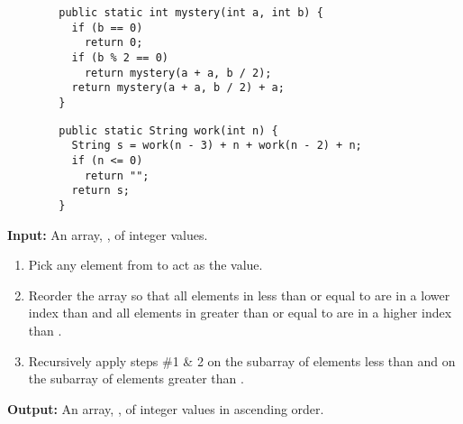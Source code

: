 

\def\AssignmentCourse{AP Computer Science A}
\def\AssignmentNumber{15}
\def\AssignmentTitle{Recursive Functions}


  \begin{questions}


      \begin{lstlisting}
        public static int mystery(int a, int b) {
          if (b == 0)
            return 0;
          if (b % 2 == 0)
            return mystery(a + a, b / 2);
          return mystery(a + a, b / 2) + a;
        }
      \end{lstlisting}

      \begin{lstlisting}
        public static String work(int n) {
          String s = work(n - 3) + n + work(n - 2) + n;
          if (n <= 0)
            return "";
          return s;
        }
      \end{lstlisting}

      \textbf{Input:} An array, , of integer values.

      \begin{enumerate}
        \item Pick any element from  to act as the  value.
        \item Reorder the array so that all elements in  less than or equal to  are in a lower index than  and all elements in  greater than or equal to  are in a higher index than .
        \item Recursively apply steps \#1 \& 2 on the subarray of elements less than  and on the subarray of elements greater than .
      \end{enumerate}

      \textbf{Output:} An array, , of integer values in ascending order.

  \end{questions}

